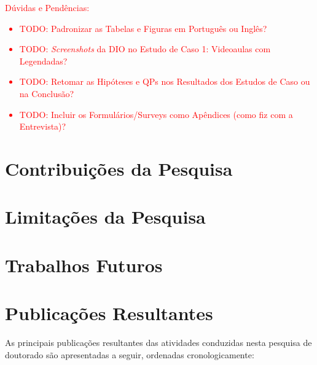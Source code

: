 
\noindent
\textcolor{red}{
Dúvidas e Pendências:
\begin{itemize}
    \item TODO: Padronizar as Tabelas e Figuras em Português ou Inglês?
    \item TODO: \textit{Screenshots} da DIO no Estudo de Caso 1: Videoaulas com Legendadas?
    \item TODO: Retomar as Hipóteses e QPs nos Resultados dos Estudos de Caso ou na Conclusão?
    \item TODO: Incluir os Formulários/Surveys como Apêndices (como fiz com a Entrevista)?
\end{itemize}
}

\section{Contribuições da Pesquisa}

\section{Limitações da Pesquisa}

\section{Trabalhos Futuros}

\section{Publicações Resultantes}

As principais publicações resultantes das atividades conduzidas nesta pesquisa de doutorado são apresentadas a seguir, ordenadas cronologicamente:

